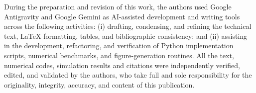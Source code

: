 \documentclass[VANCOUVER]{USG}
\begin{document}
During the preparation and revision of this work, the authors used Google Antigravity and Google Gemini as AI-assisted development and writing tools across the following activities: (i) drafting, condensing, and refining the technical text, LaTeX formatting, tables, and bibliographic consistency; and (ii) assisting in the development, refactoring, and verification of Python implementation scripts, numerical benchmarks, and figure-generation routines. All the text, numerical codes, simulation results and citations were independently verified, edited, and validated by the authors, who take full and sole responsibility for the originality, integrity, accuracy, and content of this publication.


\end{document}
